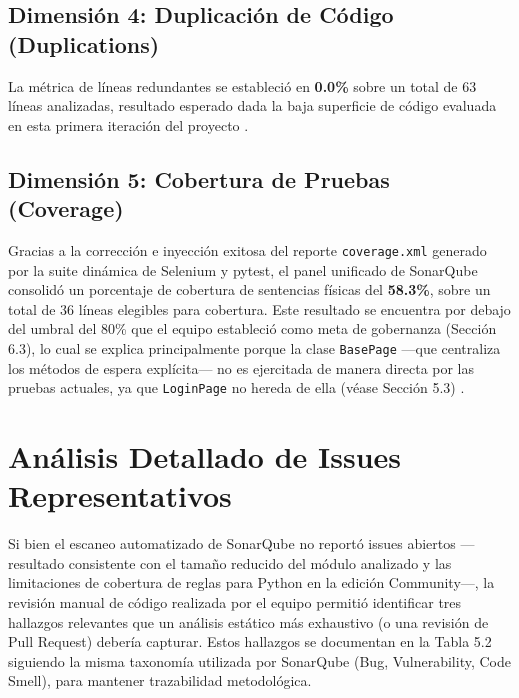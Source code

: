 \documentclass[12pt,oneside]{report}
\begin{document}
\subsection{Dimensión 4: Duplicación de Código (Duplications)}
La métrica de líneas redundantes se estableció en \textbf{0.0\%} sobre un total de 63 líneas analizadas, resultado esperado dada la baja superficie de código evaluada en esta primera iteración del proyecto \parencite{sommerville2011}.

\subsection{Dimensión 5: Cobertura de Pruebas (Coverage)}
Gracias a la corrección e inyección exitosa del reporte \texttt{coverage.xml} generado por la suite dinámica de Selenium y pytest, el panel unificado de SonarQube consolidó un porcentaje de cobertura de sentencias físicas del \textbf{58.3\%}, sobre un total de 36 líneas elegibles para cobertura. Este resultado se encuentra por debajo del umbral del 80\% que el equipo estableció como meta de gobernanza (Sección 6.3), lo cual se explica principalmente porque la clase \texttt{BasePage} —que centraliza los métodos de espera explícita— no es ejercitada de manera directa por las pruebas actuales, ya que \texttt{LoginPage} no hereda de ella (véase Sección 5.3) \parencite{pressman2014}.

\section{Análisis Detallado de Issues Representativos}

Si bien el escaneo automatizado de SonarQube no reportó issues abiertos —resultado consistente con el tamaño reducido del módulo analizado y las limitaciones de cobertura de reglas para Python en la edición Community—, la revisión manual de código realizada por el equipo permitió identificar tres hallazgos relevantes que un análisis estático más exhaustivo (o una revisión de Pull Request) debería capturar. Estos hallazgos se documentan en la Tabla 5.2 siguiendo la misma taxonomía utilizada por SonarQube (Bug, Vulnerability, Code Smell), para mantener trazabilidad metodológica.
\end{document}
